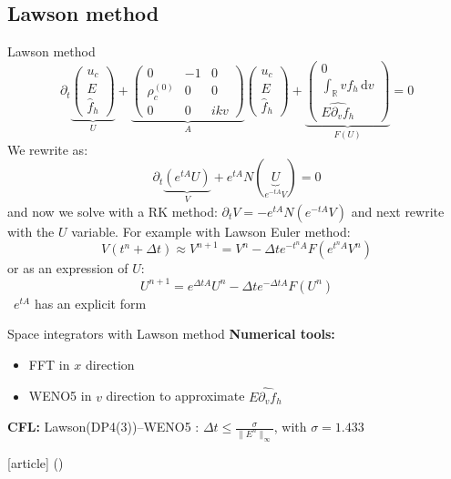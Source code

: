 \documentclass{beamer}
\newcommand{\cmark}{\color{dgreen}\ding{52}}
\newcommand{\arrow}{{\color{PLB}\ding{220}}}
\newcommand{\mbold}[1]{{\textbf{\color{PLB}#1}}}
\newcommand{\customcite}[1]{\citeauthor{#1} (\citeyear{#1})}
\begin{document}
\subsection{Lawson method}
\begin{frame}{Lawson method}
  $$
    \partial_t \underbrace{\begin{pmatrix}
      u_c\\E\\\hat{f}_h
    \end{pmatrix}}_{U} + \underbrace{\begin{pmatrix}
      0 & -1 & 0 \\ \rho_c^{(0)} & 0 & 0 \\ 0 & 0 & ikv
    \end{pmatrix}}_{A} \begin{pmatrix}
      u_c\\E\\\hat{f}_h
    \end{pmatrix} + \underbrace{\begin{pmatrix}
      0\\\int_\mathbb{R}vf_h\,\mathrm{d}v \\\widehat{E\partial_vf_h}
    \end{pmatrix}}_{F(U)} = 0
  $$
  We rewrite as:
  $$
    \partial_t\underbrace{\left(e^{tA}U\right)}_{V} + e^{tA}N(\underbrace{U}_{e^{-tA}V}) = 0
  $$
  and now we solve with a RK method: $\partial_tV = -e^{tA}N(e^{-tA}V)$ and next rewrite with the $U$ variable. For example with Lawson Euler method:
  $$
    V(t^n+\Delta t) \approx V^{n+1} = V^n - \Delta t e^{-t^nA}F(e^{t^nA}V^n)
  $$
  or as an expression of $U$:
  $$
    U^{n+1} = e^{\Delta t A}U^n - \Delta te^{-\Delta t A}F(U^n)
  $$
  \arrow\ $e^{tA}$ has an explicit form \cmark
\end{frame}

\begin{frame}{Space integrators with Lawson method}
  \mbold{Numerical tools:}
  \begin{itemize}
    \item FFT in $x$ direction
    \item WENO5 in $v$ direction to approximate $\widehat{E\partial_vf_h}$
  \end{itemize}

  \mbold{CFL:} Lawson(DP4(3))--WENO5 : $\Delta t\leq\frac{\sigma}{\|E^n\|_\infty}$, with $\sigma=1.433$
  \begin{thebibliography}{9}
    [article]
     \customcite{Crouseilles:2019b}
  \end{thebibliography}
\end{frame}
\end{document}
